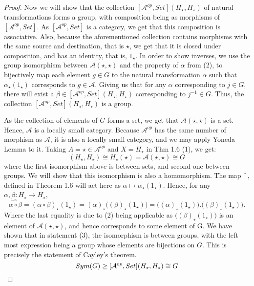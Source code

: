 \documentclass[18pt,a4paper]{article}
\theoremstyle{definition}
\begin{document}
\begin{proof}
		Now we will show that the collection $[\mathcal{A} ^{op},Set](H_\star, H_\star)$ of
		natural transformations forms a group, with composition being as morphisms of
		$[\mathcal{A} ^{op},Set]$. As $[\mathcal{A} ^{op},Set]$ is a category, we get that
		this composition is associative. Also, because the aforementioned collection contains
		morphisms with the same source and destination, that is $\star$, we get that it is
		closed under composition, and has an identity, that is, $1_\star$.
		In order to show inverses, we use the group isomorphism between
		$\mathcal{A} (\star,\star)$ and	the property of $\alpha$ from (2),
		to bijectively map each element $g\in G$ to the natural transformation $\alpha$
		such that $\alpha_\star(1_\star)$ corresponds to $g \in \mathcal{A}$.
		Giving us that for any $\alpha$ corresponding to $j\in G$, there will exist a
		$\beta \in [\mathcal{A} ^{op},Set](H_\star, H_\star)$ corresponding to $j^{-1} \in G$.
		Thus, the collection $[ \mathcal{A} ^{op}, Set](H_\star,H_\star)$ is a group.

		As the collection of elements of $G$ forms a set, we get that $\mathcal{A}(\star,\star)$
		is a set. Hence, $\mathcal{A}$ is a locally small category. Because
		$\mathcal{A} ^{op}$ has the same number of morphism as $\mathcal{A}$,
		it is also a locally small category, and we may apply Yoneda Lemma to it.
		Taking $A=\star	\in \mathcal{A} ^{op}$ and $X=H_\star$ in Thm 1.6 (1), we get:
		\begin{equation} [ \mathcal{A} ^{op}, Set](H_\star,H_\star) \cong H_\star(\star)
		= \mathcal{A} (\star,\star) \cong G\end{equation}
		where the first isomorphism above is between sets, and second one between groups.
		We will show that this isomorphism is also a homomorphism.
		The map $\string ^$, defined in Theorem 1.6 will act here as $\alpha
		\mapsto \alpha_\star (1_\star)$. Hence, for any $\alpha,\beta:H_\star
		\to H_\star$,
		\begin{equation}
			\widehat {\alpha \circ \beta}= (\alpha \circ \beta)_\star(1_\star)
			=(\alpha)_\star \Big( (\beta)_\star (1_\star) \Big)=
			\Big((\alpha)_\star(1_\star) \Big) . \Big( (\beta)_\star (1_\star) \Big).
		\end{equation}
		Where the last equality is due to (2) being applicable
		as $\Big((\beta)_\star (1_\star)\Big)$ is an element of $\mathcal{A} (\star,\star)$,
		and hence corresponds to some element of G.
		We have shown that in statement (3), the isomorphism is between groups,
		with the left most expression being a group whose elements are bijections
		on $G$. This is
		precisely the statement of Cayley's theorem.
		\[ Sym(G) \geq [ \mathcal{A} ^{op}, Set](H_\star,H_\star) \cong G \qedhere \]
	\end{proof}
\end{document}
